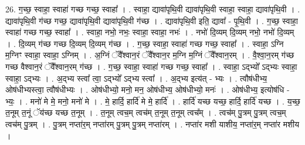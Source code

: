 \documentclass[17pt]{extarticle}
\begin{document}
26. ग॒च्छ॒ स्वाहा॒ स्वाहा॑ गच्छ गच्छ॒ स्वाहा᳚ । . स्वाहा॒ द्यावा॑पृथि॒वी द्यावा॑पृथि॒वी स्वाहा॒ स्वाहा॒ द्यावा॑पृथि॒वी । . द्यावा॑पृथि॒वी ग॑च्छ गच्छ॒ द्यावा॑पृथि॒वी द्यावा॑पृथि॒वी ग॑च्छ । . द्यावा॑पृथि॒वी इति॒ द्यावा᳚ - पृ॒थि॒वी । . ग॒च्छ॒ स्वाहा॒ स्वाहा॑ गच्छ गच्छ॒ स्वाहा᳚ । . स्वाहा॒ नभो॒ नभः॒ स्वाहा॒ स्वाहा॒ नभः॑ । . नभो॑ दि॒व्यम् दि॒व्यम् नभो॒ नभो॑ दि॒व्यम् । . दि॒व्यम् ग॑च्छ गच्छ दि॒व्यम् दि॒व्यम् ग॑च्छ । . ग॒च्छ॒ स्वाहा॒ स्वाहा॑ गच्छ गच्छ॒ स्वाहा᳚ । . स्वाहा॒ ऽग्नि म॒ग्निꣳ स्वाहा॒ स्वाहा॒ ऽग्निम् । . अ॒ग्निं ॅवै᳚श्वान॒रं ॅवै᳚श्वान॒र म॒ग्नि म॒ग्निं ॅवै᳚श्वान॒रम् । . वै॒श्वा॒न॒रम् ग॑च्छ गच्छ वैश्वान॒रं ॅवै᳚श्वान॒रम् ग॑च्छ । . ग॒च्छ॒ स्वाहा॒ स्वाहा॑ गच्छ गच्छ॒ स्वाहा᳚ । . स्वाहा॒ ऽद्भ्यो᳚ ऽद्भ्यः स्वाहा॒ स्वाहा॒ ऽद्भ्यः । . अ॒द्भ्य स्त्वा᳚ त्वा॒ ऽद्भ्यो᳚ ऽद्भ्य स्त्वा᳚ । . अ॒द्भ्य इत्य॑त् - भ्यः । . त्वौष॑धीभ्य॒ ओष॑धीभ्यस्त्वा॒ त्वौष॑धीभ्यः । . ओष॑धीभ्यो॒ मनो॒ मन॒ ओष॑धीभ्य॒ ओष॑धीभ्यो॒ मनः॑ । . ओष॑धीभ्य॒ इत्योष॑धि - भ्यः॒ । . मनो॑ मे मे॒ मनो॒ मनो॑ मे । . मे॒ हार्दि॒ हार्दि॑ मे मे॒ हार्दि॑ । . हार्दि॑ यच्छ यच्छ॒ हार्दि॒ हार्दि॑ यच्छ । . य॒च्छ॒ त॒नूम् त॒नूं ॅय॑च्छ यच्छ त॒नूम् । . त॒नूम् त्वच॒म् त्वच॑म् त॒नूम् त॒नूम् त्वच᳚म् । . त्वच॑म् पु॒त्रम् पु॒त्रम् त्वच॒म् त्वच॑म् पु॒त्रम् । . पु॒त्रम् नप्ता॑र॒म् नप्ता॑रम् पु॒त्रम् पु॒त्रम् नप्ता॑रम् । . नप्ता॑र मशी याशीय॒ नप्ता॑र॒म् नप्ता॑र मशीय । \newline
\end{document}
